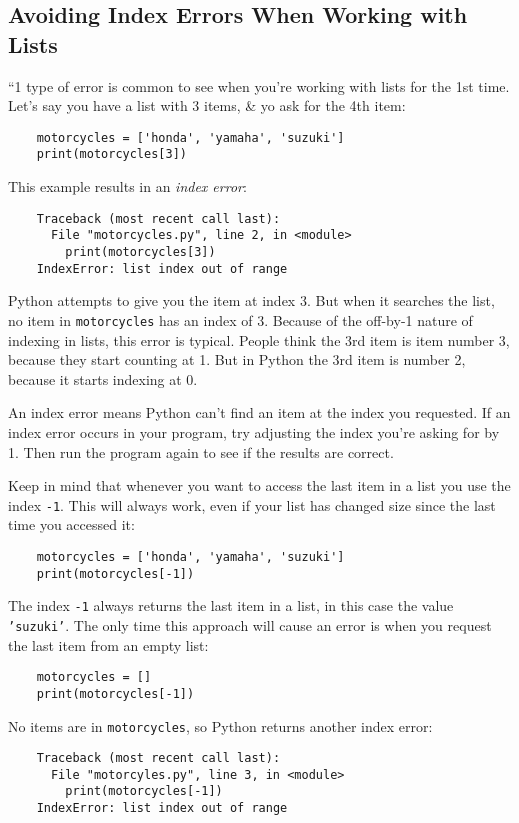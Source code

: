 \documentclass[oneside]{book}
\numberwithin{equation}{section}
\begin{document}
\subsection{Avoiding Index Errors When Working with Lists}
``1 type of error is common to see when you're working with lists for the 1st time. Let's say you have a list with 3 items, \& yo ask for the 4th item:
\begin{verbatim}
	motorcycles = ['honda', 'yamaha', 'suzuki']
	print(motorcycles[3])
\end{verbatim}
This example results in an \textit{index error}:
\begin{verbatim}
	Traceback (most recent call last):
	  File "motorcycles.py", line 2, in <module>
	    print(motorcycles[3])
	IndexError: list index out of range
\end{verbatim}
Python attempts to give you the item at index 3. But when it searches the list, no item in \texttt{motorcycles} has an index of 3. Because of the off-by-1 nature of indexing in lists, this error is typical. People think the 3rd item is item number 3, because they start counting at 1. But in Python the 3rd item is number 2, because it starts indexing at 0.

An index error means Python can't find an item at the index you requested. If an index error occurs in your program, try adjusting the index you're asking for by 1. Then run the program again to see if the results are correct.

Keep in mind that whenever you want to access the last item in a list you use the index \texttt{-1}. This will always work, even if your list has changed size since the last time you accessed it:
\begin{verbatim}
	motorcycles = ['honda', 'yamaha', 'suzuki']
	print(motorcycles[-1])
\end{verbatim}
The index \texttt{-1} always returns the last item in a list, in this case the value \texttt{'suzuki'}. The only time this approach will cause an error is when you request the last item from an empty list:
\begin{verbatim}
	motorcycles = []
	print(motorcycles[-1])
\end{verbatim}
No items are in \texttt{motorcycles}, so Python returns another index error:
\begin{verbatim}
	Traceback (most recent call last):
	  File "motorcyles.py", line 3, in <module>
	    print(motorcycles[-1])
	IndexError: list index out of range
\end{verbatim}
\end{document}
